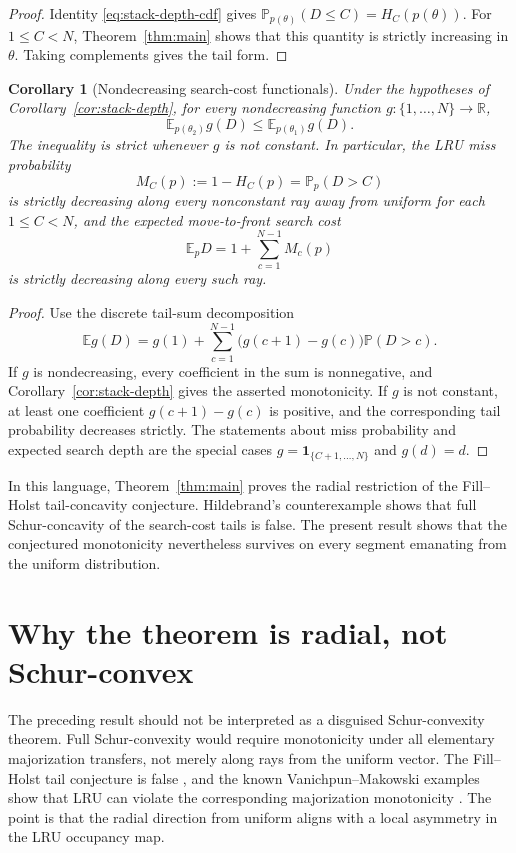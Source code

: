\documentclass[11pt]{article}
\newtheorem{corollary}[theorem]{Corollary}
\theoremstyle{remark}
\newcommand{\R}{\mathbb{R}}
\newcommand{\E}{\mathbb{E}}
\newcommand{\Pp}{\mathbb{P}}
\newcommand{\one}{\mathbf{1}}
\begin{document}
\begin{proof}
Identity \eqref{eq:stack-depth-cdf} gives
$\Pp_{p(\theta)}(D\le C)=H_C(p(\theta))$.  For $1\le C<N$,
Theorem~\ref{thm:main} shows that this quantity is strictly increasing in
$\theta$.  Taking complements gives the tail form.
\end{proof}

\begin{corollary}[Nondecreasing search-cost functionals]\label{cor:increasing-costs}
Under the hypotheses of Corollary~\ref{cor:stack-depth}, for every
nondecreasing function $g:\{1,\ldots,N\}\to\R$,
\[
        \E_{p(\theta_2)}g(D)\le \E_{p(\theta_1)}g(D).
\]
The inequality is strict whenever $g$ is not constant.  In particular, the
LRU miss probability
\[
        M_C(p):=1-H_C(p)=\Pp_p(D>C)
\]
is strictly decreasing along every nonconstant ray away from uniform for
each $1\le C<N$, and the expected move-to-front search cost
\[
        \E_p D=1+\sum_{c=1}^{N-1}M_c(p)
\]
is strictly decreasing along every such ray.
\end{corollary}

\begin{proof}
Use the discrete tail-sum decomposition
\begin{equation}\label{eq:g-tail-decomp}
        \E g(D)=g(1)+\sum_{c=1}^{N-1}\bigl(g(c+1)-g(c)\bigr)\Pp(D>c).
\end{equation}
If $g$ is nondecreasing, every coefficient in the sum is nonnegative, and
Corollary~\ref{cor:stack-depth} gives the asserted monotonicity.  If
$g$ is not constant, at least one coefficient $g(c+1)-g(c)$ is positive,
and the corresponding tail probability decreases strictly.  The statements
about miss probability and expected search depth are the special cases
$g=\one_{\{C+1,\ldots,N\}}$ and $g(d)=d$.
\end{proof}

In this language, Theorem~\ref{thm:main} proves the radial restriction of
the Fill--Holst tail-concavity conjecture.  Hildebrand's counterexample
shows that full Schur-concavity of the search-cost tails is false.  The
present result shows that the conjectured monotonicity nevertheless
survives on every segment emanating from the uniform distribution.

\section{Why the theorem is radial, not Schur-convex}\label{sec:not-schur}

The preceding result should not be interpreted as a disguised
Schur-convexity theorem.  Full Schur-convexity would require monotonicity
under all elementary majorization transfers, not merely along rays from the
uniform vector.  The Fill--Holst tail conjecture is false
\cite{Hildebrand1999}, and the known Vanichpun--Makowski examples show
that LRU can violate the corresponding majorization monotonicity
\cite{VanichpunMakowski2004,MakowskiVanichpun2005}.
The point is that the radial direction from uniform aligns with a local
asymmetry in the LRU occupancy map.
\end{document}
